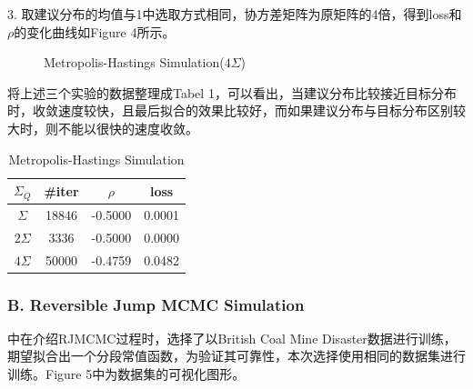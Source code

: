 \documentclass[twocolumn]{article}
\begin{document}
3. 取建议分布的均值与1中选取方式相同，协方差矩阵为原矩阵的4倍，得到loss和$\rho$的变化曲线如Figure 4所示。

\begin{figure}[H]
  \centering
  \hspace{0in}
  \caption{Metropolis-Hastings Simulation($4\Sigma$)}
\end{figure}

将上述三个实验的数据整理成Tabel 1，可以看出，当建议分布比较接近目标分布时，收敛速度较快，且最后拟合的效果比较好，而如果建议分布与目标分布区别较大时，则不能以很快的速度收敛。

\begin{table}[H]
\centering
\begin{tabular}{c|ccc}
\hline
$\Sigma_Q$ & \#iter & $\rho$ & loss \\
\hline
$\Sigma$ & 18846 & -0.5000 & 0.0001 \\
$2\Sigma$ & 3336 & -0.5000 & 0.0000 \\
$4\Sigma$ & 50000 & -0.4759 & 0.0482 \\
\hline
\end{tabular}
\caption{Metropolis-Hastings Simulation}
\end{table}

\subsubsection*{B. Reversible Jump MCMC Simulation}

\cite{doi:10.1093/biomet/82.4.711}中在介绍RJMCMC过程时，选择了以British Coal Mine Disaster数据进行训练，期望拟合出一个分段常值函数，为验证其可靠性，本次选择使用相同的数据集进行训练。Figure 5中为数据集的可视化图形。
\end{document}

